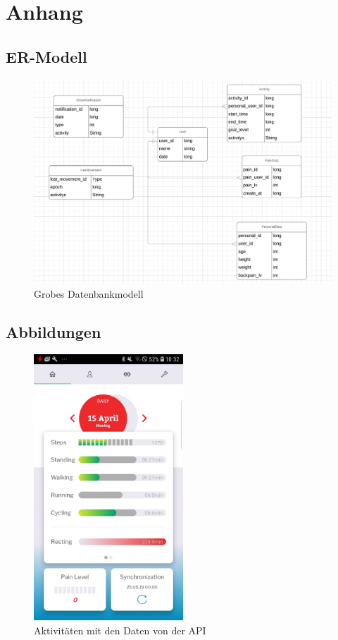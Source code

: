 \chapter{Anhang}
\section{ER-Modell}
\begin{figure}[ht]
	\centering
	\includegraphics[width=1.1\textwidth]{Datenbank.png}
	\caption{\label{fig:ER-Modell}Grobes Datenbankmodell}
	
\end{figure}
\newpage

\section{Abbildungen}
\begin{figure}[ht]
	\centering
	\includegraphics[width=0.5\textwidth]{Activitys.jpg}
	\caption{\label{fig:Activity}Aktivitäten mit den Daten von der API }
	
\end{figure}

